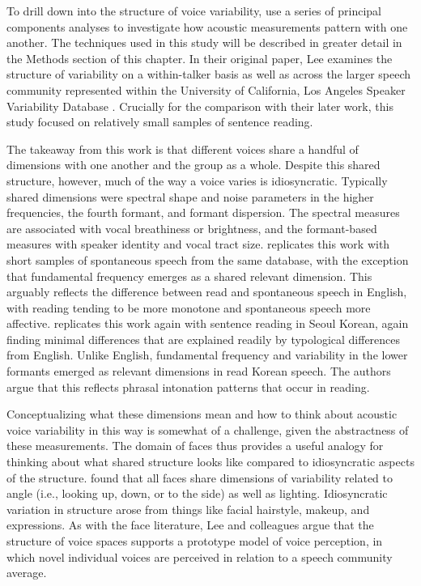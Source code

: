 To drill down into the structure of voice variability, \citet{lee_2019_acoustic} use a series of principal components analyses to investigate how acoustic measurements pattern with one another. The techniques used in this study will be described in greater detail in the Methods section of this chapter. In their original paper, Lee examines the structure of variability on a within-talker basis as well as across the larger speech community represented within the University of California, Los Angeles Speaker Variability Database \citep{keating_2019_database}. Crucially for the comparison with their later work, this study focused on relatively small samples of sentence reading. 

The takeaway from this work is that different voices share a handful of dimensions with one another and the group as a whole. Despite this shared structure, however, much of the way a voice varies is idiosyncratic. Typically shared dimensions were spectral shape and noise parameters in the higher frequencies, the fourth formant, and formant dispersion. The spectral measures are associated with vocal breathiness or brightness, and the formant-based measures with speaker identity and vocal tract size. \citet{lee_2019_spontaneous} replicates this work with short samples of spontaneous speech from the same database, with the exception that fundamental frequency emerges as a shared relevant dimension. This arguably reflects the difference between read and spontaneous speech in English, with reading tending to be more monotone and spontaneous speech more affective. \citet{lee_2020_language} replicates this work again with sentence reading in Seoul Korean, again finding minimal differences that are explained readily by typological differences from English. Unlike English, fundamental frequency and variability in the lower formants emerged as relevant dimensions in read Korean speech. The authors argue that this reflects phrasal intonation patterns that occur in reading. 

Conceptualizing what these dimensions mean and how to think about acoustic voice variability in this way is somewhat of a challenge, given the abstractness of these measurements. The domain of faces thus provides a useful analogy for thinking about what shared structure looks like compared to idiosyncratic aspects of the structure. \citet{burton_2016_faces} found that all faces share dimensions of variability related to angle (i.e., looking up, down, or to the side) as well as lighting. Idiosyncratic variation in structure arose from things like facial hairstyle, makeup, and expressions. As with the face literature, Lee and colleagues argue that the structure of voice spaces supports a prototype model of voice perception, in which novel individual voices are perceived in relation to a speech community average. 

